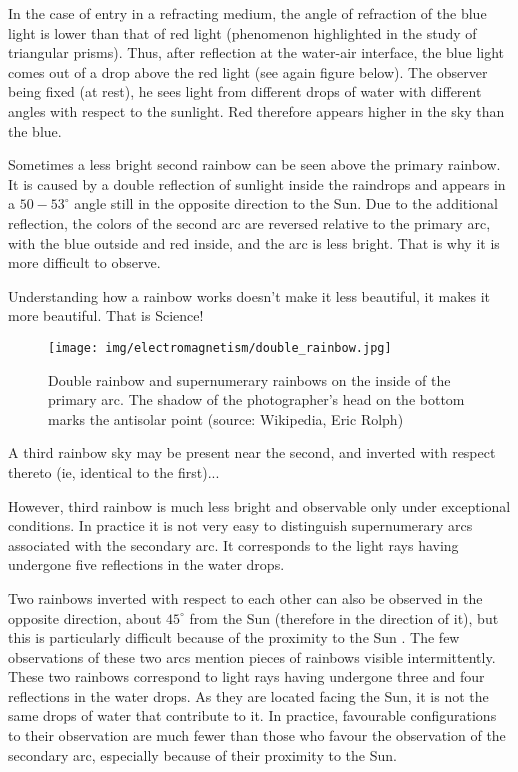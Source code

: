 	In the case of entry in a refracting medium, the angle of refraction of the blue light is lower than that of red light (phenomenon highlighted in the study of triangular prisms). Thus, after reflection at the water-air interface, the blue light comes out of a drop above the red light (see again figure below). The observer being fixed (at rest), he sees light from different drops of water with different angles with respect to the sunlight. Red therefore appears higher in the sky than the blue.
	
	Sometimes a less bright second rainbow can be seen above the primary rainbow. It is caused by a double reflection of sunlight inside the raindrops and appears in a $50-53^\circ$ angle still in the opposite direction to the Sun. Due to the additional reflection, the colors of the second arc are reversed relative to the primary arc, with the blue outside and red inside, and the arc is less bright. That is why it is more difficult to observe. 
	
	\begin{fquote}Understanding how a rainbow works doesn't make it less beautiful, it makes it more beautiful. That is Science!
 	\end{fquote}
 	
	\begin{figure}[H]
		\centering
		\texttt{[image: img/electromagnetism/double\_rainbow.jpg]}
		\caption[]{Double rainbow and supernumerary rainbows on the inside of the primary arc. The shadow of the photographer's head on the bottom marks the antisolar point (source: Wikipedia, Eric Rolph)}
	\end{figure}
	A third rainbow sky may be present near the second, and inverted with respect thereto (ie, identical to the first)...
	
	However, third rainbow is much less bright and observable only under exceptional conditions. In practice it is not very easy to distinguish supernumerary arcs associated with the secondary arc. It corresponds to the light rays having undergone five reflections in the water drops. 

	Two rainbows inverted with respect to each other can also be observed in the opposite direction, about $45^\circ$ from the Sun (therefore in the direction of it), but this is particularly difficult because of the proximity to the Sun . The few observations of these two arcs mention pieces of rainbows visible intermittently. These two rainbows correspond to light rays having undergone three and four reflections in the water drops. As they are located facing the Sun, it is not the same drops of water that contribute to it. In practice, favourable configurations to their observation are much fewer than those who favour the observation of the secondary arc, especially because of their proximity to the Sun.

